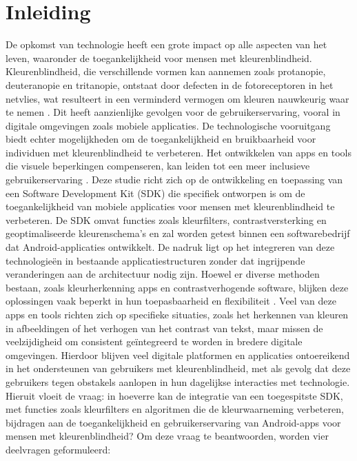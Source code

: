 \section{Inleiding}%
\label{sec:inleiding}
De opkomst van technologie heeft een grote impact op alle aspecten van het leven, waaronder de 
toegankelijkheid voor mensen met kleurenblindheid. Kleurenblindheid, die verschillende vormen kan 
aannemen zoals protanopie, deuteranopie en tritanopie, ontstaat door defecten in de fotoreceptoren 
in het netvlies, wat resulteert in een verminderd vermogen om kleuren nauwkeurig waar te nemen 
\textcite{Salih2020}. Dit heeft aanzienlijke gevolgen voor de gebruikerservaring, vooral in digitale 
omgevingen zoals mobiele applicaties. De technologische vooruitgang biedt echter mogelijkheden om de 
toegankelijkheid en bruikbaarheid voor individuen met kleurenblindheid te verbeteren. Het ontwikkelen 
van apps en tools die visuele beperkingen compenseren, kan leiden tot een meer inclusieve 
gebruikerservaring \textcite{Bandyopadhyay2017}. Deze studie richt zich op de ontwikkeling en toepassing van een Software 
Development Kit (SDK) die specifiek ontworpen is om de toegankelijkheid van mobiele applicaties 
voor mensen met kleurenblindheid te verbeteren. De SDK omvat functies zoals kleurfilters, 
contrastversterking en geoptimaliseerde kleurenschema’s en zal worden getest binnen een 
softwarebedrijf dat Android-applicaties ontwikkelt. De nadruk ligt op het integreren van deze 
technologieën in bestaande applicatiestructuren zonder dat ingrijpende veranderingen aan de 
architectuur nodig zijn. Hoewel er diverse methoden bestaan, zoals kleurherkenning apps en 
contrastverhogende software, blijken deze oplossingen vaak beperkt in hun toepasbaarheid en 
flexibiliteit \textcite{Baswaraju2020}. Veel van deze apps en tools richten zich op specifieke situaties, zoals het herkennen 
van kleuren in afbeeldingen of het verhogen van het contrast van tekst, maar missen de veelzijdigheid 
om consistent geïntegreerd te worden in bredere digitale omgevingen. Hierdoor blijven veel digitale 
platformen en applicaties ontoereikend in het ondersteunen van gebruikers met kleurenblindheid, met 
als gevolg dat deze gebruikers tegen obstakels aanlopen in hun dagelijkse interacties met 
technologie. Hieruit vloeit de vraag: in hoeverre kan de integratie van een toegespitste SDK, met 
functies zoals kleurfilters en algoritmen die de kleurwaarneming verbeteren, bijdragen aan de 
toegankelijkheid en gebruikerservaring van Android-apps voor mensen met kleurenblindheid?
Om deze vraag te beantwoorden, worden vier deelvragen geformuleerd:

